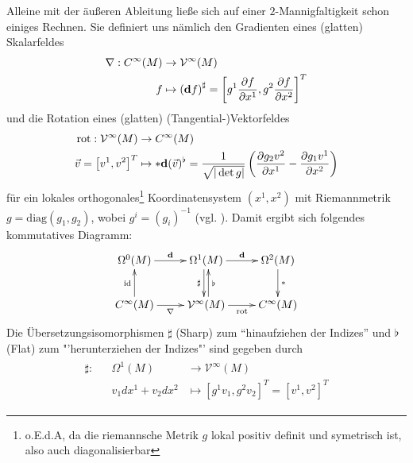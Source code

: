  Alleine mit der äußeren Ableitung ließe sich auf einer \( 2 \)-Mannigfaltigkeit schon einiges Rechnen.
  Sie definiert uns nämlich den Gradienten eines (glatten) Skalarfeldes 
  \begin{align}
    \begin{aligned}
      \nabla: C^{\infty}(M) &\rightarrow \mathcal{V}^{\infty}(M) \\
                            f  &\mapsto \left( \mathbf{d} f \right)^{\sharp}
                                        = \left[ g^{1} \frac{\partial f}{\partial x^{1}}, g^{2} \frac{\partial f}{\partial x^{2}} \right]^{T}
    \end{aligned}
  \end{align}
  und die Rotation eines (glatten) (Tangential-)Vektorfeldes
  \begin{align}
    \begin{aligned}
      \text{rot}: \mathcal{V}^{\infty}(M) &\rightarrow C^{\infty}(M) \\
                \vec{v} = \left[ v^{1}, v^{2} \right]^{T} &\mapsto * \mathbf{d} (\vec{v})^{\flat}
                                                           = \frac{1}{\sqrt{|\det g|}}\left( \frac{\partial g_{2}v^{2}}{\partial x^{1}} -  \frac{\partial g_{1}v^{1}}{\partial x^{2}}\right)
    \end{aligned}
  \end{align}
  für ein lokales orthogonales\footnote{o.E.d.A, da die riemannsche Metrik \( g  \) lokal positiv definit und symetrisch ist, also auch diagonalisierbar} 
  Koordinatensystem \( (x^{1}, x^{2}) \) mit Riemannmetrik \( g = \text{diag}(g_{1},g_{2}) \), wobei \( g^{i}=(g_{i})^{-1} \) (vgl. \cite{nitschke}). 
  Damit ergibt sich folgendes kommutatives Diagramm:
  \begin{align}
    \label{diag2DimAusAbleitung}
    \begin{xy} \xymatrix{
      \Omega^{0}(M) \ar[r]^{\exd} & \Omega^{1}(M) \ar[r]^{\exd} \ar@<-2pt>[d]_{\sharp} & \Omega^{2}(M) \ar[d]^{*}\\
      C^{\infty}(M) \ar[r]_{\nabla} \ar[u]^{\text{id}} & \mathcal{V}^{\infty}(M) \ar[r]_{\text{rot}} \ar@<-2pt>[u]_{\flat} & C^{\infty}(M) }
    \end{xy}
  \end{align}
  Die Übersetzungsisomorphismen \( \sharp \) (Sharp) zum "`hinaufziehen der Indizes"' und \( \flat \) (Flat) zum "'herunterziehen der Indizes"' sind gegeben durch
  \begin{align}
    \begin{aligned}
      \sharp:&& \Omega^{1}(M) &\rightarrow \mathcal{V}^{\infty}(M) \\
            &&   v_{1} dx^{1} + v_{2} dx^{2} &\mapsto \left[ g^{1}v_{1}, g^{2}v_{2} \right]^{T} = \left[ v^{1}, v^{2} \right]^{T}
    \end{aligned}
  \end{align}
